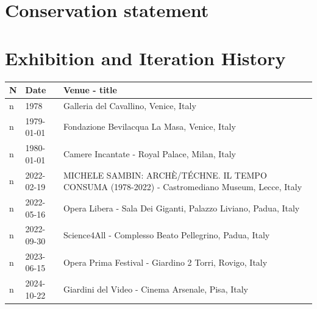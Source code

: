 \documentclass[a4paper,12pt]{article}
\begin{document}
    \section*{Conservation statement}
    

    \section*{Exhibition and Iteration History}
    \begin{longtable}{|p{}|p{}|p{}|} 
    \hline
    \textbf{N} & \textbf{Date} & \textbf{Venue - title} \\ 
    \hline
    \endfirsthead
    n & 1978 & Galleria del Cavallino, Venice, Italy\\\hline n & 1979-01-01 & Fondazione Bevilacqua La Masa, Venice, Italy\\\hline n & 1980-01-01 & Camere Incantate - Royal Palace, Milan, Italy\\\hline n & 2022-02-19 & MICHELE SAMBIN: ARCHÈ/TÉCHNE. IL TEMPO CONSUMA (1978-2022) - Castromediano Museum, Lecce, Italy\\\hline n & 2022-05-16 & Opera Libera - Sala Dei Giganti, Palazzo Liviano, Padua, Italy\\\hline n & 2022-09-30 & Science4All - Complesso Beato Pellegrino, Padua, Italy\\\hline n & 2023-06-15 & Opera Prima Festival - Giardino 2 Torri, Rovigo, Italy\\\hline n & 2024-10-22 & Giardini del Video - Cinema Arsenale, Pisa, Italy\\\hline 

    \end{longtable}
    
\end{document}

